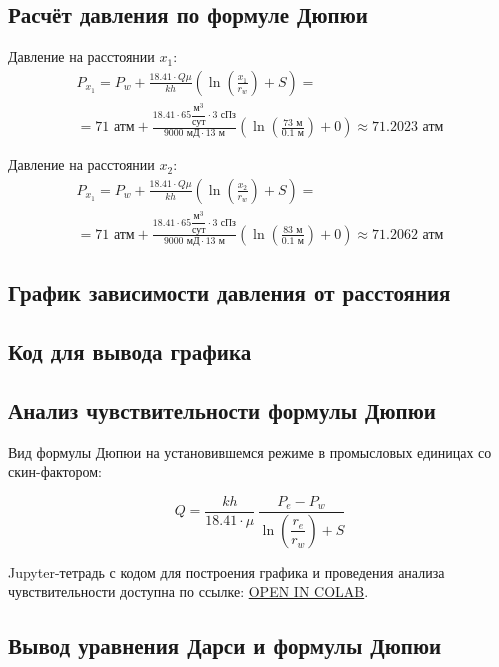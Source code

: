 \documentclass[a4paper,12pt]{article}
\newcommand{\beq}{\begin{equation}}
\newcommand{\eeq}{\end{equation}}
\begin{document}
\subsection{Расчёт давления по формуле Дюпюи}

Давление на расстоянии $x_1$:
\begin{multline}
P_{x_1}=P_w+\frac{18.41\cdot Q\mu}{kh}\left(\ln{\left(\frac{x_1}{r_w}\right)+S}\right)
=\\=71\text{ атм}+\frac{18.41\cdot 65\dfrac{\text{м}^3}{\text{сут}}\cdot3\text{ сПз}}{9000\text{ мД}\cdot 13\text{ м}}\left(\ln{\left(\frac{73\text{ м}}{0.1\text{ м}}\right)}+0\right)\approx 71.2023\text{ атм}
\end{multline}

Давление на расстоянии $x_2$:
\begin{multline}
P_{x_1}=P_w+\frac{18.41\cdot Q\mu}{kh}\left(\ln{\left(\frac{x_2}{r_w}\right)+S}\right)
=\\=71\text{ атм}+\frac{18.41\cdot 65\dfrac{\text{м}^3}{\text{сут}}\cdot3\text{ сПз}}{9000\text{ мД}\cdot 13\text{ м}}\left(\ln{\left(\frac{83\text{ м}}{0.1\text{ м}}\right)}+0\right)\approx 71.2062\text{ атм}
\end{multline}


\subsection{График зависимости давления от расстояния}

\subsection{Код для вывода графика}

\subsection{Анализ чувствительности формулы Дюпюи}

Вид формулы Дюпюи на установившемся режиме в промысловых единицах со скин-фактором:

\beq
Q=\frac{kh}{18.41\cdot\mu}\,\frac{P_e-P_w}{\ln{\left(\dfrac{r_e}{r_w}\right)+S}}
\eeq

Jupyter-тетрадь с кодом для построения графика и проведения анализа чувствительности доступна по ссылке: \href{https://colab.research.google.com/github/mualal/notebooks-source/blob/master/6_pressure.ipynb}{OPEN IN COLAB}.

\subsection{Вывод уравнения Дарси и формулы Дюпюи}
\end{document}
